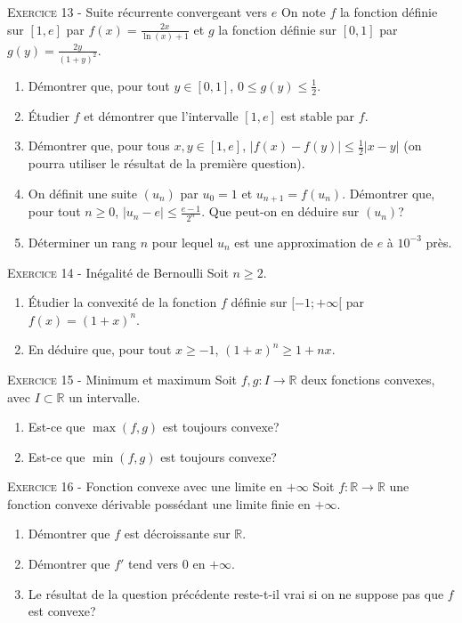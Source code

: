 

\vskip0.3cm\noindent\textsc{Exercice 13} - Suite récurrente convergeant vers $e$
\vskip0.2cm
On note $f$ la fonction définie sur $[1,e]$ par $f(x)=\frac{2x}{\ln (x)+1}$ et $g$ la fonction définie sur $[0,1]$ par $g(y)=\frac{2y}{(1+y)^2}$. 
\begin{enumerate}
\item Démontrer que, pour tout $y\in [0,1]$, $0\leq g(y)\leq \frac{1}2$. 
\item \'Etudier $f$ et démontrer que l'intervalle $[1,e]$ est stable par $f$. 
\item Démontrer que, pour tous $x,y\in [1,e]$, $|f(x)-f(y)|\leq \frac 12|x-y|$ (on pourra utiliser le résultat de la première question).
\item On définit une suite $(u_n)$ par $u_0=1$ et $u_{n+1}=f(u_n)$. Démontrer que, pour tout 
$n\geq 0$, $|u_n-e|\leq\frac{e-1}{2^n}$. Que peut-on en déduire sur $(u_n)$?
\item Déterminer un rang $n$ pour lequel $u_n$ est une approximation de $e$ à $10^{-3}$ près.
\end{enumerate}




\vskip0.3cm\noindent\textsc{Exercice 14} - Inégalité de Bernoulli
\vskip0.2cm
Soit $n\geq 2$. 
\begin{enumerate}
 \item \'Etudier la convexité de la fonction $f$ définie sur $[-1;+\infty[$ par $f(x)=(1+x)^n$. 
 \item En déduire que, pour tout $x\geq -1$, $(1+x)^n\geq 1+nx$.
\end{enumerate}




\vskip0.3cm\noindent\textsc{Exercice 15} - Minimum et maximum
\vskip0.2cm
Soit $f,g:I\to\mathbb R$ deux fonctions convexes, avec $I\subset \mathbb R$ un intervalle.
\begin{enumerate}
\item Est-ce que $\max(f,g)$ est toujours convexe?
\item Est-ce que $\min(f,g)$ est toujours convexe?
\end{enumerate}




\vskip0.3cm\noindent\textsc{Exercice 16} - Fonction convexe avec une limite en $+\infty$
\vskip0.2cm
Soit $f:\mathbb R\to\mathbb R$ une fonction convexe dérivable possédant une limite finie en $+\infty$.
\begin{enumerate}
\item Démontrer que $f$ est décroissante sur $\mathbb R$.
\item Démontrer que $f'$ tend vers $0$ en $+\infty$.
\item Le résultat de la question précédente reste-t-il vrai si on ne suppose pas que $f$ est convexe?
\end{enumerate}


